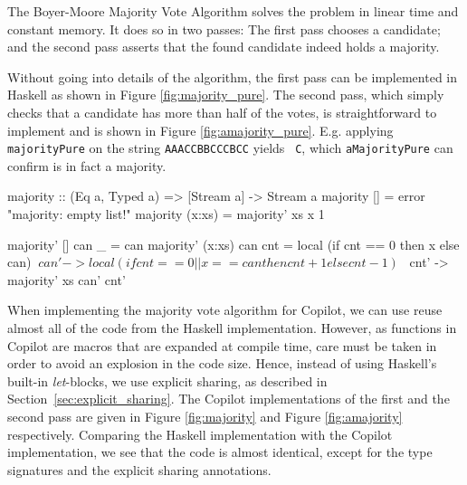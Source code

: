 \documentclass[]{article}
\theoremstyle{example}
\begin{document}
The Boyer-Moore Majority Vote Algorithm \cite{MooreBoyer82,Hesselink2005} solves
the problem in linear time and constant memory. It does so in two passes: The
first pass chooses a candidate; and the second pass asserts that the
found candidate indeed holds a majority.

Without going into details of the algorithm, the first pass can be implemented
in Haskell as shown in Figure \ref{fig:majority_pure}. The second pass, which
simply checks that a candidate has more than half of the votes, is
straightforward to implement and is shown in Figure \ref{fig:amajority_pure}.
E.g. applying {\tt majorityPure} on the string {\tt AAACCBBCCCBCC} yields {\tt
  C}, which {\tt aMajorityPure} can confirm is in fact a majority.

\begin{figure*}[ht]
\begin{code}
majority :: (Eq a, Typed a) => [Stream a] -> Stream a
majority []     = error "majority: empty list!"
majority (x:xs) = majority' xs x 1

majority' []     can _   = can
majority' (x:xs) can cnt =
  local
    (if cnt == 0 then x else can) $
      \ can' ->
        local (if cnt == 0 || x == can then cnt+1 else cnt-1) $
          \ cnt' ->
            majority' xs can' cnt'
\end{code}
\caption{The first pass of the majority vote algorithm in Copilot.}
\label{fig:majority}
\end{figure*}

\begin{figure*}[ht]
\caption{The second pass of the majority vote algorithm in Copilot.}
\label{fig:amajority}
\end{figure*}

When implementing the majority vote algorithm for Copilot, we can use reuse
almost all of the code from the Haskell implementation. However, as functions
in Copilot are macros that are expanded at compile time, care must
be taken in order to avoid an explosion in the code size. Hence, instead of
using Haskell's built-in \emph{let}-blocks, we use explicit sharing, as
described in Section~\ref{sec:explicit_sharing}. The Copilot implementations
of the first and the second pass are given in Figure \ref{fig:majority} and
Figure \ref{fig:amajority} respectively. Comparing the Haskell implementation
with the Copilot implementation, we see that the code is almost identical,
except for the type signatures and the explicit sharing annotations.
\end{document}
